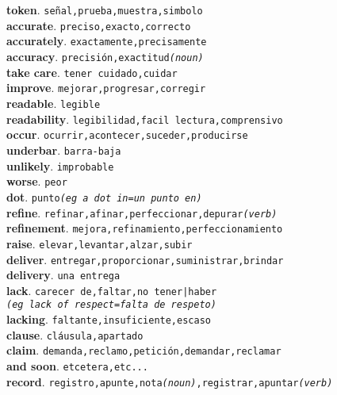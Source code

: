 \documentclass[twocolumn]{article}
\begin{document}
	\textsf{\textbf{token}}. \texttt{se\~nal,prueba,muestra,simbolo}\\
	\textsf{\textbf{accurate}}. \texttt{preciso,exacto,correcto}\\
	\textsf{\textbf{accurately}}. \texttt{exactamente,precisamente}\\
	\textsf{\textbf{accuracy}}. \texttt{precisi\'on,exactitud{\scriptsize \textsl{(noun)}}}\\
	\textsf{\textbf{take care}}. \texttt{tener cuidado,cuidar}\\
	\textsf{\textbf{improve}}. \texttt{mejorar,progresar,corregir}\\
	\textsf{\textbf{readable}}. \texttt{legible}\\
	\textsf{\textbf{readability}}. \texttt{legibilidad,facil lectura,comprensivo}\\
	\textsf{\textbf{occur}}. \texttt{ocurrir,acontecer,suceder,producirse}\\
	\textsf{\textbf{underbar}}. \texttt{barra-baja}\\
	\textsf{\textbf{unlikely}}. \texttt{improbable}\\
	\textsf{\textbf{worse}}. \texttt{peor}\\
	\textsf{\textbf{dot}}. \texttt{punto{\scriptsize \textsl{(eg a dot in=un punto en)}}}\\
	\textsf{\textbf{refine}}. \texttt{refinar,afinar,perfeccionar,depurar{\scriptsize \textsl{(verb)}}}\\
	\textsf{\textbf{refinement}}. \texttt{mejora,refinamiento,perfeccionamiento}\\
	\textsf{\textbf{raise}}. \texttt{elevar,levantar,alzar,subir}\\
	\textsf{\textbf{deliver}}. \texttt{entregar,proporcionar,suministrar,brindar}\\
	\textsf{\textbf{delivery}}. \texttt{una entrega}\\
	\textsf{\textbf{lack}}. \texttt{carecer de,faltar,no tener|haber\\{\scriptsize \textsl{(eg lack of respect=falta de respeto)}}}\\
	\textsf{\textbf{lacking}}. \texttt{faltante,insuficiente,escaso}\\
	\textsf{\textbf{clause}}. \texttt{cl\'ausula,apartado}\\
	\textsf{\textbf{claim}}. \texttt{demanda,reclamo,petici\'on,demandar,reclamar}\\
	\textsf{\textbf{and soon}}. \texttt{etcetera,etc...}\\
	\textsf{\textbf{record}}. \texttt{registro,apunte,nota{\scriptsize \textsl{(noun)}},registrar,apuntar{\scriptsize \textsl{(verb)}}}\\
\end{document}
